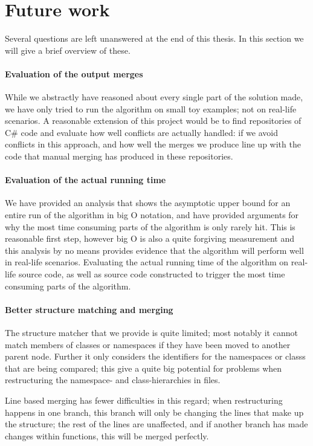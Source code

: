 \documentclass[11pt]{article}
\begin{document}
\clearpage
\section{Future work}
Several questions are left unanswered at the end of this thesis. In this section we will give a brief overview of these.

\paragraph{Evaluation of the output merges} While we abstractly have reasoned about every single part of the solution made, we have only tried to run the algorithm on small toy examples; not on real-life scenarios. A reasonable extension of this project would be to find repositories of C\# code and evaluate how well conflicts are actually handled: if we avoid conflicts in this approach, and how well the merges we produce line up with the code that manual merging has produced in these repositories.

\paragraph{Evaluation of the actual running time} We have provided an analysis that shows the asymptotic upper bound for an entire run of the algorithm in big O notation, and have provided arguments for why the most time consuming parts of the algorithm is only rarely hit. This is reasonable first step, however big O is also a quite forgiving measurement and this analysis by no means provides evidence that the algorithm will perform well in real-life scenarios. Evaluating the actual running time of the algorithm on real-life source code, as well as source code constructed to trigger the most time consuming parts of the algorithm.

\paragraph{Better structure matching and merging} The structure matcher that we provide is quite limited; most notably it cannot match members of classes or namespaces if they have been moved to another parent node. Further it only considers the identifiers for the namespaces or classs that are being compared; this give a quite big potential for problems when restructuring the namespace- and class-hierarchies in files.

Line based merging has fewer difficulties in this regard; when restructuring happens in one branch, this branch will only be changing the lines that make up the structure; the rest of the lines are unaffected, and if another branch has made changes within functions, this will be merged perfectly.
\end{document}
